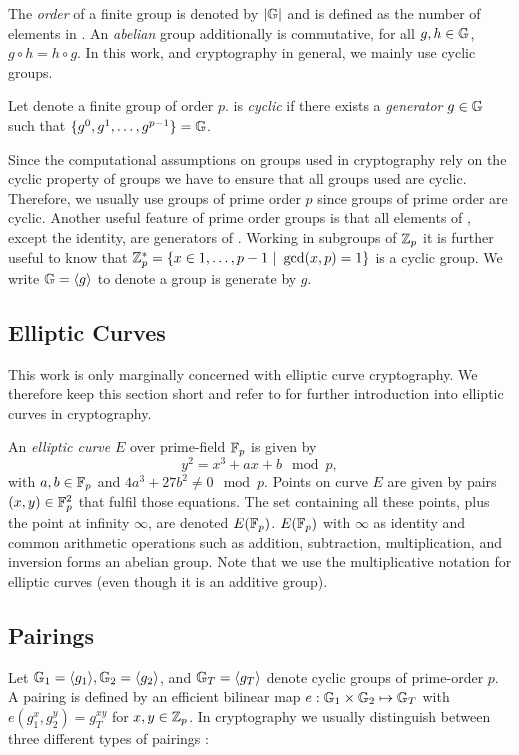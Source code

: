 \noindent
The \emph{order} of a finite group \GG is denoted by $|\GG|$ and is defined as the number of elements in \GG.
An \emph{abelian} group additionally is commutative, \ie for all $g,h\in\GG$, $g\circ h=h\circ g$.
In this work, and cryptography in general, we mainly use cyclic groups.

\begin{definition}\label{def:cyclicgroups}
Let \GG denote a finite group of order $p$.
\GG is \emph{cyclic} if there exists a \emph{generator} $g\in\GG$ such that $\{g^0,g^1,\dots,g^{p-1}\}=\GG$.
\eod
\end{definition}

\noindent
Since the computational assumptions on groups used in cryptography rely on the cyclic property of groups we have to ensure that all groups used are cyclic.
Therefore, we usually use groups of prime order $p$ since groups of prime order are cyclic.
Another useful feature of prime order groups is that all elements of \GG, except the identity, are generators of \GG.
Working in subgroups of $\ZZ_p$ it is further useful to know that $\ZZ^\ast_p=\{x\in{1,\dots,p-1}~|~\gcd(x,p)=1\}$ is a cyclic group.
We write $\GG=\genG$ to denote a group \GG is generate by $g$.

\subsection{Elliptic Curves}
This work is only marginally concerned with elliptic curve cryptography.
We therefore keep this section short and refer to \cite{HankersonMS03} for further introduction into elliptic curves in cryptography.

An \emph{elliptic curve} $E$ over prime-field $\FF_p$ is given by 
\[
  y^2 = x^3 + ax + b \mod p,
\]
with $a,b\in\FF_p$ and $4a^3 + 27b^2 \not= 0 \mod p$.
Points on curve $E$ are given by pairs $(x,y)\in\FF^2_p$ that fulfil those equations.
The set containing all these points, plus the point at infinity $\infty$, are denoted $E(\FF_p)$.
$E(\FF_p)$ with $\infty$ as identity and common arithmetic operations such as addition, subtraction, multiplication, and inversion forms an abelian group.
Note that we use the multiplicative notation for elliptic curves (even though it is an additive group).

\subsection{Pairings}
Let $\GG_1=\genG[1], \GG_2=\genG[2]$, and $\GG_T=\genG[T]$ denote cyclic groups of prime-order $p$.
A pairing is defined by an efficient bilinear map $e: \GG_1 \times \GG_2 \mapsto \GG_T$ with $e(g_1^x, g_2^y) = g_T^{xy}$ for $x,y\in\ZZ_p$.
In cryptography we usually distinguish between three different types of pairings \cite{GalbraithPS08}:

